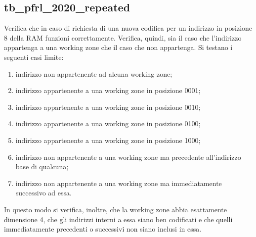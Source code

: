 \documentclass [a4paper, 12pt]{article}
\begin{document}
\subsection{tb\_pfrl\_2020\_repeated}
Verifica che in caso di richiesta di una nuova codifica per un indirizzo in posizione 8 della RAM funzioni correttamente. Verifica, quindi, sia il caso che l'indirizzo appartenga a una working zone che il caso che non appartenga. Si testano i seguenti casi limite:
\begin{enumerate}
\item indirizzo non appartenente ad alcuna working zone;
\item indirizzo appartenente a una working zone in posizione 0001;
\item indirizzo appartenente a una working zone in posizione 0010;
\item indirizzo appartenente a una working zone in posizione 0100;
\item indirizzo appartenente a una working zone in posizione 1000;
\item indirizzo non appartenente a una working zone ma precedente all'indirizzo base di qualcuna;
\item indirizzo non appartenente a una working zone ma immediatamente successivo ad essa.
\end{enumerate}
In questo modo si verifica, inoltre, che la working zone abbia esattamente dimensione 4, che gli indirizzi interni a essa siano ben codificati e che quelli immediatamente precedenti o successivi non siano inclusi in essa.
\end{document}
